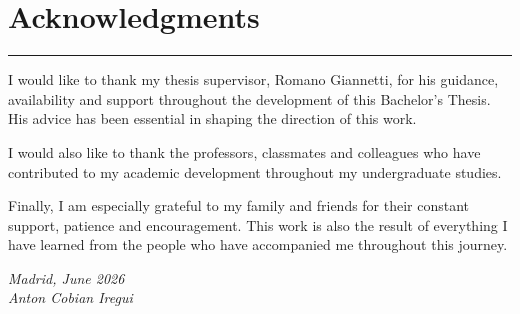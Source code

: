 \chapter*{Acknowledgments}

\vspace*{0.6cm}
{\color{gray!50}\rule{1.5cm}{0.5pt}}
\vspace{0.8cm}

\noindent
\begin{minipage}{0.82\textwidth}
\setlength{\parskip}{0.55cm}
\setlength{\parindent}{0pt}

I would like to thank my thesis supervisor, Romano Giannetti, for his guidance,
availability and support throughout the development of this Bachelor's Thesis.
His advice has been essential in shaping the direction of this work.

I would also like to thank the professors, classmates and colleagues who have
contributed to my academic development throughout my undergraduate studies.

Finally, I am especially grateful to my family and friends for their constant
support, patience and encouragement. This work is also the result of everything I
have learned from the people who have accompanied me throughout this journey.

\vspace{1.8cm}
\noindent\textit{Madrid, June 2026}\\[2pt]
\textit{Anton Cobian Iregui}

\end{minipage}